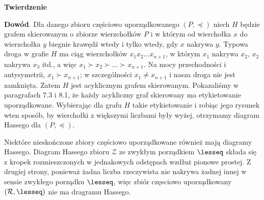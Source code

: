 \documentclass[14pt]{extarticle}
\begin{document}
\textbf{Twierdzenie}
\begin{changemargin}{160pt}{0pt}
\noindent{}

\qquad \textbf{Dowód}. Dla danego zbioru częściowo uporządkowanego $(\mathit{P}, \preceq)$ niech $\mathit{H}$ będzie grafem skierowanym o zbiorze wierzchołków $\mathit{P}$ i w którym od wierchołka $\mathit{x}$ do wierzchołka $\mathit{y}$ biegnie krawędź wtedy i tylko wtedy, gdy $\mathit{x}$ nakrywa $\mathit{y}$. Typowa droga w grafie $\mathit{H}$ ma ciąg wierzchołków $x_{1}x_2...x_{n+1}$, w którym $x_{1}$ nakrywa $x_{2}$, $x_{2}$ nakrywa $x_{3}$ itd., a więc $x_{1} \succ x_{2} \succ ... \succ x_{n+1}$. Na mocy przechodności i antysymetrii, $x_{1} \succ x_{n+1}$; w szczególności $x_{1} \ne x_{n+1}$ i nasza droga nie jest zamknięta. Zatem $\mathit{H}$ jest acyklicznym grafem skierowanym. Pokazaliśmy w paragrafach 7.3 i 8.1, że każdy acykliczny graf skierowany ma etykietowanie uporządkowane. Wybierając dla grafu $\mathit{H}$ takie etykietowanie i robiąc jego rysunek wten sposób, by wierchołki z większymi liczbami były wyżej, otrzymamy diagram Hassego dla $(\mathit{P}, \preceq)$.

\qquad Niektóre nieskończone zbiory częściowo uporządkowane również mają diagramy Hassego. Diagram Hassego zbioru $\mathcal{Z}$ ze zwykłym porządkiem $\lesseq$ składa się z kropek rozmieszczonych w jednakowych odstępach wzdłuż pionowe prostej. Z drugiej strony, ponieważ żadna liczba rzeczywista nie nakrywa żadnej innej w sensie zwykłego porządku $\lesseq$, więc zbiór częsciowo uporządkowany $(\mathcal{R},\lesseq)$ nie ma dragramu Hassego.
\end{changemargin}
\end{document}

